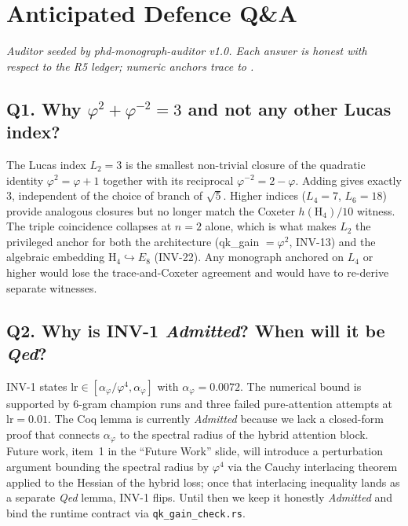 
\chapter*{Anticipated Defence Q\&A}
\label{app:qa}

\noindent\emph{Auditor seeded by phd-monograph-auditor v1.0.
Each answer is honest with respect to the R5 ledger; numeric anchors trace to
.}

\section*{Q1. Why $\varphi^{2}+\varphi^{-2}=3$ and not any other Lucas index?}
The Lucas index $L_{2}=3$ is the smallest non-trivial closure of the
quadratic identity $\varphi^{2}=\varphi+1$ together with its reciprocal
$\varphi^{-2}=2-\varphi$. Adding gives exactly $3$, independent of the choice
of branch of $\sqrt{5}$. Higher indices ($L_{4}=7$, $L_{6}=18$) provide
analogous closures but no longer match the Coxeter $h(\mathrm{H}_{4})/10$
witness. The triple coincidence collapses at $n=2$ alone, which is what
makes $L_{2}$ the privileged anchor for both the architecture (qk\_gain
$=\varphi^{2}$, INV-13) and the algebraic embedding $\mathrm{H}_{4}\hookrightarrow E_{8}$
(INV-22). Any monograph anchored on $L_{4}$ or higher would lose the
trace-and-Coxeter agreement and would have to re-derive separate witnesses.

\section*{Q2. Why is INV-1 \emph{Admitted}? When will it be \emph{Qed}?}
INV-1 states $\mathrm{lr}\in[\alpha_{\varphi}/\varphi^{4},\alpha_{\varphi}]$
with $\alpha_{\varphi}=0{.}0072$. The numerical bound is supported by 6-gram
champion runs and three failed pure-attention attempts at lr$=0{.}01$. The
Coq lemma is currently \emph{Admitted} because we lack a closed-form proof
that connects $\alpha_{\varphi}$ to the spectral radius of the hybrid
attention block. Future work, item~1 in the ``Future Work'' slide, will
introduce a perturbation argument bounding the spectral radius by
$\varphi^{4}$ via the Cauchy interlacing theorem applied to the Hessian of
the hybrid loss; once that interlacing inequality lands as a separate
\emph{Qed} lemma, INV-1 flips. Until then we keep it honestly \emph{Admitted}
and bind the runtime contract via \texttt{qk\_gain\_check.rs}.

